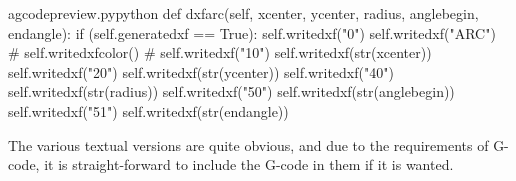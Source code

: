 \documentclass{ltxdoc}
\begin{document}

\lstset{firstnumber=\thegcpy}
\begin{writecode}{a}{gcodepreview.py}{python}
    def dxfarc(self, xcenter, ycenter, radius, anglebegin, endangle):
        if (self.generatedxf == True):
            self.writedxf("0")
            self.writedxf("ARC")
#
            self.writedxfcolor()
#
            self.writedxf("10")
            self.writedxf(str(xcenter))
            self.writedxf("20")
            self.writedxf(str(ycenter))
            self.writedxf("40")
            self.writedxf(str(radius))
            self.writedxf("50")
            self.writedxf(str(anglebegin))
            self.writedxf("51")
            self.writedxf(str(endangle))

\end{writecode}
\addtocounter{gcpy}{18}

%

The various textual versions are quite obvious, and due to the requirements of G-code, it is straight-forward to include the G-code in them if it is wanted.
\end{document}
